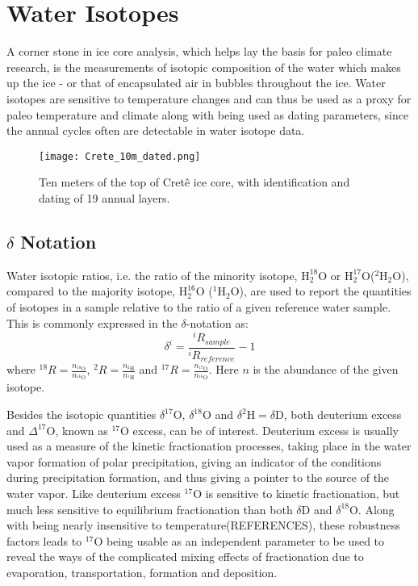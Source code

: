 \documentclass[../../CompleteThesis2/Complete_2ndDraft]{subfiles}
\begin{document}
\section[Water Isotopes][Water Isotopes]{Water Isotopes}
\label{Sec:Ice_WaterIsotopes}

A corner stone in ice core analysis, which helps lay the basis for paleo climate research, is the measurements of isotopic composition of the water which makes up the ice - or that of encapsulated air in bubbles throughout the ice. Water isotopes are sensitive to temperature changes and can thus be used as a proxy for paleo temperature and climate along with being used as dating parameters, since the annual cycles often are detectable in water isotope data.

\begin{figure}[h]
	\centering
	\texttt{[image: Crete\_10m\_dated.png]}
	\caption{Ten meters of the top of Cretê ice core, with identification and dating of 19 annual layers.}
	\label{Fig:ICE_Crete_10m_dated}
\end{figure}


\subsection[$\delta$ Notation]{$\delta$ Notation}
\label{Subsec:Ice_WaterIsotopes_deltaNotation}

Water isotopic ratios, i.e. the ratio of the minority isotope, ${\text{H}_2^{18}\text{O}}$ or ${\text{H}_2^{17}\text{O}}$($^2\text{H}_2\text{O}$), compared to the majority isotope, ${\text{H}_2^{16}\text{O}}$ ($^1\text{H}_2\text{O}$), are used to report the quantities of isotopes in a sample relative to the ratio of a given reference water sample. This is commonly expressed in the $\delta$-notation as:
\begin{equation}
	\delta^i = \frac{^iR_{sample}}{^iR_{reference}} - 1		
\end{equation}
where $^{18}R = \frac{n_{^{18}\text{O}}}{n_{^{16}\text{O}}}$, $^{2}R = \frac{n_{^{2}\text{H}}}{n_{^{1}\text{H}}}$  and $^{17}R = \frac{n_{^{17}\text{O}}}{n_{^{16}\text{O}}}$. Here $n$ is the abundance of the given isotope.

Besides the isotopic quantities $\delta^{17}\text{O}$, $\delta^{18}\text{O}$ and $\delta^2\text{H} = \delta\text{D}$, both deuterium excess and $\Delta^{17}\text{O}$, known as $^{17}\text{O}$ excess, can be of interest. Deuterium excess is usually used as a measure of the kinetic fractionation processes, taking place in the water vapor formation of polar precipitation, giving an indicator of the conditions during precipitation formation, and thus giving a pointer to the source of the water vapor.
Like deuterium excess $^{17}\text{O}$ is sensitive to kinetic fractionation, but much less sensitive to equilibrium fractionation than both $\delta$D and $\delta^{18}$O. Along with being nearly insensitive to temperature(REFERENCES), these robustness factors leads to $^{17}$O being usable as an independent parameter to be used to reveal the ways of the complicated mixing effects of fractionation due to evaporation, transportation, formation and deposition.
\end{document}
